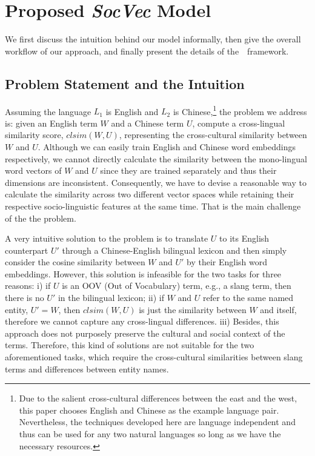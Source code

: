 \section{Proposed \textit{SocVec} Model}
\label{sec:socvec}
We first discuss the intuition behind our model informally, then give the overall workflow of our approach, and finally present the details of the~\textit{\socvec}~framework. 

\subsection{Problem Statement and the Intuition}
Assuming the language $L_1$ is English and $L_2$ is Chinese,\footnote{Due to the salient cross-cultural differences between the east and the west, 
this paper chooses English and Chinese as the example language pair. 
Nevertheless, the techniques developed here are language independent and 
thus can be used for any two natural languages so long as 
we have the necessary resources.} the problem we address is: given 
an English term $W$ and a Chinese term $U$, compute a cross-lingual 
similarity score, $clsim(W, U)$, representing the cross-cultural 
similarity between $W$ and $U$. 
Although we can easily train English and Chinese word embeddings 
respectively, we cannot directly calculate 
the similarity between the mono-lingual word vectors of $W$ and $U$ 
since they are trained separately and thus their dimensions 
are inconsistent.
Consequently, we have to devise a reasonable way to calculate the 
similarity across two different vector spaces while retaining 
their respective socio-linguistic features at the same time.
That is the main challenge of the the problem. 

A very intuitive solution to the problem is to translate $U$ to its English 
counterpart $U'$ through a Chinese-English bilingual lexicon and then simply consider 
the cosine similarity between $W$ and $U'$ by their English word embeddings.
However, this solution is infeasible for the two tasks for three reasons: 
i) if $U$ is an OOV (Out of Vocabulary) term, e.g., a slang term, 
then there is no $U'$ in the bilingual lexicon; 
ii) if $W$ and $U$ refer to the same named entity, $U' = W$, 
then $clsim(W, U)$ is just the similarity between $W$ and itself, 
therefore we cannot capture any cross-lingual differences. 
iii) Besides, this approach does not purposely preserve the 
cultural and social context of the terms. 
Therefore, this kind of solutions are not suitable for the two aforementioned 
tasks, which require the cross-cultural similarities between slang terms 
and differences between entity names.

